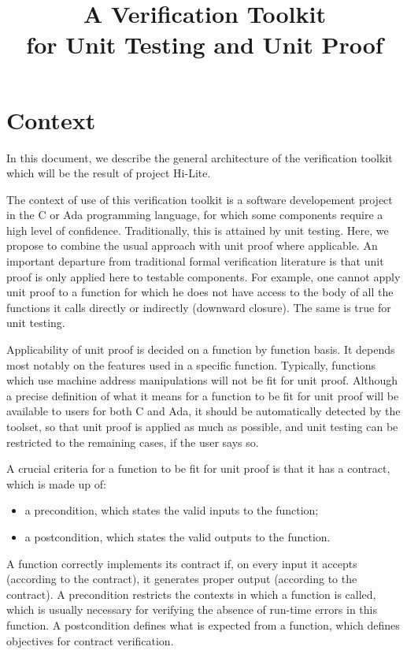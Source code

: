 \documentclass{article}
\title{A Verification Toolkit\\for Unit Testing and Unit Proof}
\newcounter{example}
\begin{document}
\maketitle

\section{Context}

In this document, we describe the general architecture of the verification
toolkit which will be the result of project Hi-Lite.

The context of use of this verification toolkit is a software developement
project in the C or Ada programming language, for which some components require
a high level of confidence. Traditionally, this is attained by unit
testing. Here, we propose to combine the usual approach with unit proof where
applicable. An important departure from traditional formal verification
literature is that unit proof is only applied here to testable components. For
example, one cannot apply unit proof to a function for which he does not have
access to the body of all the functions it calls directly or indirectly
(downward closure). The same is true for unit testing.

Applicability of unit proof is decided on a function by function basis. It
depends most notably on the features used in a specific function. Typically,
functions which use machine address manipulations will not be fit for unit
proof. Although a precise definition of what it means for a function to be fit
for unit proof will be available to users for both C and Ada, it should be
automatically detected by the toolset, so that unit proof is applied as much as
possible, and unit testing can be restricted to the remaining cases, if the
user says so.

A crucial criteria for a function to be fit for unit proof is that it has a
contract, which is made up of:
\begin{itemize}
\item a precondition, which states the valid inputs to the function;
\item a postcondition, which states the valid outputs to the function.
\end{itemize}

A function correctly implements its contract if, on every input it accepts
(according to the contract), it generates proper output (according to the
contract). A precondition restricts the contexts in which a function is
called, which is usually necessary for verifying the absence of run-time errors
in this function.  A postcondition defines what is expected from a function,
which defines objectives for contract verification.
\end{document}
